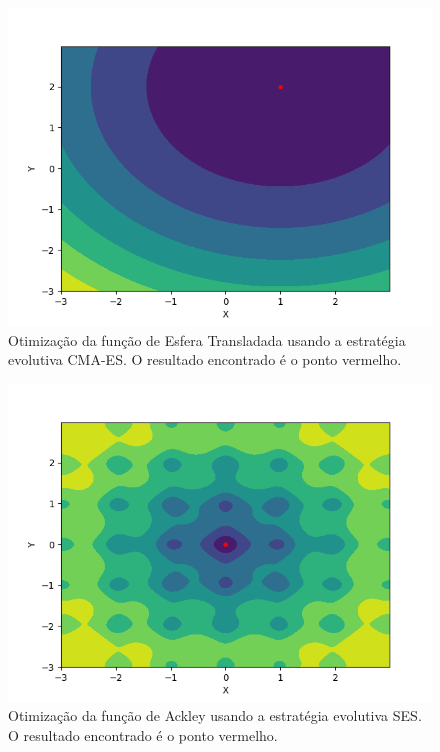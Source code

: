 \documentclass[conference]{IEEEtran}
\begin{document}
\begin{figure}[htbp]
\centering
\centerline{\includegraphics[scale=0.5]{imagens/translated_sphere/cmaes.png}}
\caption{Otimização da função de Esfera Transladada usando a estratégia evolutiva CMA-ES. O resultado encontrado é o ponto vermelho.}
\label{translated_sphere/cmaes}
\end{figure}

\begin{figure}[htbp]
\centering
\centerline{\includegraphics[scale=0.5]{imagens/ackley/ses.png}}
\caption{Otimização da função de Ackley usando a estratégia evolutiva SES. O resultado encontrado é o ponto vermelho.}
\label{ackley/ses}
\end{figure} 
\end{document}
